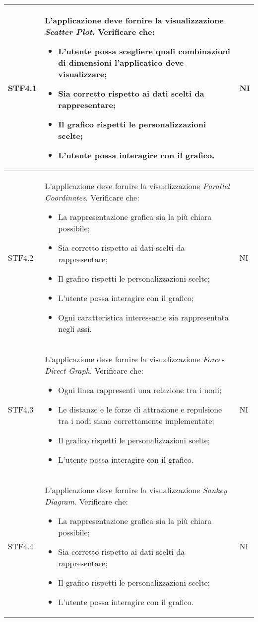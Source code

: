 \begin{longtable}{|p{1.5cm}|p{11cm}|p{1cm}|}
        STF4.1 & L'applicazione deve fornire la visualizzazione  \textit{Scatter Plot}. Verificare che: \begin{itemize}
            \item L'utente possa scegliere quali combinazioni di dimensioni l'applicatico deve visualizzare;
            \item Sia corretto rispetto ai dati scelti da rappresentare;
            \item Il grafico rispetti le personalizzazioni scelte;
            \item L'utente possa interagire con il grafico.
        \end{itemize} & NI\\ \hline

        STF4.2 & L'applicazione deve fornire la visualizzazione  \textit{Parallel Coordinates}. Verificare che: \begin{itemize}
            \item La rappresentazione grafica sia la più chiara possibile;
            \item Sia corretto rispetto ai dati scelti da rappresentare;
            \item Il grafico rispetti le personalizzazioni scelte;
            \item L'utente possa interagire con il grafico;
            \item Ogni caratteristica interessante sia rappresentata negli assi.
        \end{itemize} & NI\\ \hline

        STF4.3 & L'applicazione deve fornire la visualizzazione  \textit{Force-Direct Graph}. Verificare che: \begin{itemize}
            \item Ogni linea rappresenti una relazione tra i nodi;
            \item Le distanze e le forze di attrazione e repulsione tra i nodi siano correttamente implementate;
            \item Il grafico rispetti le personalizzazioni scelte;
            \item L'utente possa interagire con il grafico.
        \end{itemize} & NI\\ \hline

        STF4.4 & L'applicazione deve fornire la visualizzazione  \textit{Sankey Diagram}. Verificare che: \begin{itemize}
            \item La rappresentazione grafica sia la più chiara possibile;
            \item Sia corretto rispetto ai dati scelti da rappresentare;
            \item Il grafico rispetti le personalizzazioni scelte;
            \item L'utente possa interagire con il grafico.
        \end{itemize} & NI\\ \hline


\end{longtable}
